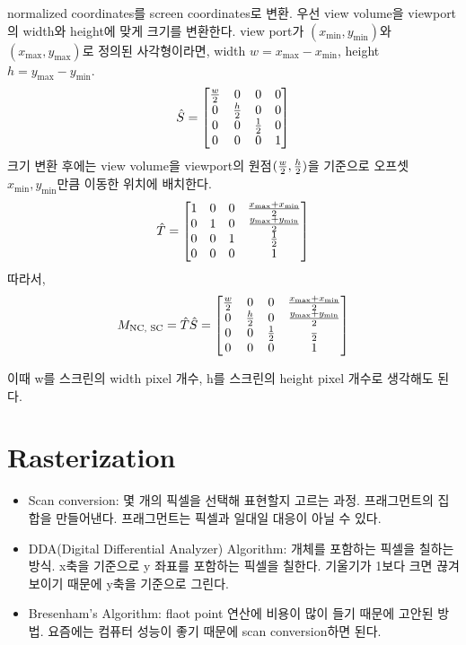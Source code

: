 normalized coordinates를 screen coordinates로 변환. 우선 view volume을 viewport의 width와 height에 맞게 크기를 변환한다. view port가 $(x_\text{min}, y_\text{min})$와 $(x_\text{max}, y_\text{max})$로 정의된 사각형이라면, width $w = x_\text{max} - x_\text{min}$, height $h = y_\text{max} - y_\text{min}$.
$$
\hat S =
  \begin{bmatrix}
    w \over 2 & 0 & 0 & 0 \\
    0 & h \over 2 & 0 & 0 \\
    0 & 0 & 1 \over 2 & 0 \\
    0 & 0 & 0 & 1
  \end{bmatrix}
$$
크기 변환 후에는 view volume을 viewport의 원점$({w \over 2}, {h \over 2})$을 기준으로 오프셋 $x_\text{min}, y_\text{min}$만큼 이동한 위치에 배치한다.
$$
\hat T =
  \begin{bmatrix}
    1 & 0 & 0 & {x_\text{max} + x_\text{min} \over 2} \\
    0 & 1 & 0 & {y_\text{max} + y_\text{min} \over 2} \\
    0 & 0 & 1 & 1 \over 2 \\
    0 & 0 & 0 & 1
  \end{bmatrix}
$$
따라서,
$$
M_\text{NC, SC} =
\hat T \hat S =
  \begin{bmatrix}
    w \over 2 & 0 & 0 & {x_\text{max} + x_\text{min} \over 2} \\
    0 & h \over 2 & 0 & {y_\text{max} + y_\text{min} \over 2} \\
    0 & 0 & 1 \over 2 & \over 2 \\
    0 & 0 & 0 & 1
  \end{bmatrix}
$$

이때  w를 스크린의 width pixel 개수, h를 스크린의 height pixel 개수로 생각해도 된다.

\section{Rasterization}

\begin{itemize}
  \item Scan conversion: 몇 개의 픽셀을 선택해 표현할지 고르는 과정. 프래그먼트의 집합을 만들어낸다. 프래그먼트는 픽셀과 일대일 대응이 아닐 수 있다.
  \item DDA(Digital Differential Analyzer) Algorithm: 개체를 포함하는 픽셀을 칠하는 방식. x축을 기준으로 y 좌표를 포함하는 픽셀을 칠한다. 기울기가 1보다 크면 끊겨 보이기 때문에 y축을 기준으로 그린다.
  \item Bresenham's Algorithm: flaot point 연산에 비용이 많이 들기 때문에 고안된 방법. 요즘에는 컴퓨터 성능이 좋기 때문에 scan conversion하면 된다.
\end{itemize}

